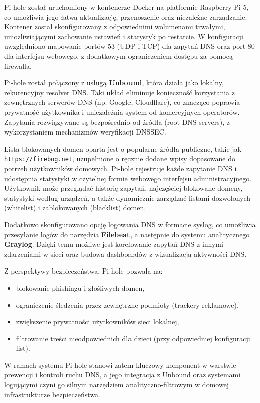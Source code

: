 \documentclass[
    left=2.5cm,         %
    right=2.5cm,        %
    top=2.5cm,          %
    bottom=3cm,         %
    bindingoffset=6mm,  %
    nohyphenation=true %
]{eiti/eiti-thesis} %
\begin{document}
Pi-hole został uruchomiony w kontenerze Docker na platformie Raspberry Pi 5, co umożliwia jego łatwą aktualizację, przenoszenie oraz niezależne zarządzanie. Kontener został skonfigurowany z odpowiednimi wolumenami trwałymi, umożliwiającymi zachowanie ustawień i statystyk po restarcie. W konfiguracji uwzględniono mapowanie portów 53 (UDP i TCP) dla zapytań DNS oraz port 80 dla interfejsu webowego, z dodatkowym ograniczeniem dostępu za pomocą firewalla.

Pi-hole został połączony z usługą \textbf{Unbound}, która działa jako lokalny, rekurencyjny resolver DNS. Taki układ eliminuje konieczność korzystania z zewnętrznych serwerów DNS (np. Google, Cloudflare), co znacząco poprawia prywatność użytkownika i uniezależnia system od komercyjnych operatorów. Zapytania rozwiązywane są bezpośrednio od źródła (root DNS servers), z wykorzystaniem mechanizmów weryfikacji DNSSEC.

Lista blokowanych domen oparta jest o popularne źródła publiczne, takie jak \texttt{https://firebog.net}, uzupełnione o ręcznie dodane wpisy dopasowane do potrzeb użytkowników domowych. Pi-hole rejestruje każde zapytanie DNS i udostępnia statystyki w czytelnej formie webowego interfejsu administracyjnego. Użytkownik może przeglądać historię zapytań, najczęściej blokowane domeny, statystyki według urządzeń, a także dynamicznie zarządzać listami dozwolonych (whitelist) i zablokowanych (blacklist) domen.

Dodatkowo skonfigurowano opcję logowania DNS w formacie syslog, co umożliwia przesyłanie logów do narzędzia \textbf{Filebeat}, a następnie do systemu analitycznego \textbf{Graylog}. Dzięki temu możliwe jest korelowanie zapytań DNS z innymi zdarzeniami w sieci oraz budowa dashboardów z wizualizacją aktywności DNS.

Z perspektywy bezpieczeństwa, Pi-hole pozwala na:
\begin{itemize}
    \item blokowanie phishingu i złośliwych domen,
    \item ograniczenie śledzenia przez zewnętrzne podmioty (trackery reklamowe),
    \item zwiększenie prywatności użytkowników sieci lokalnej,
    \item filtrowanie treści nieodpowiednich dla dzieci (przy odpowiedniej konfiguracji list).
\end{itemize}

W ramach systemu Pi-hole stanowi zatem kluczowy komponent w warstwie prewencji i kontroli ruchu DNS, a jego integracja z Unbound oraz systemami logującymi czyni go silnym narzędziem analityczno-filtrowym w domowej infrastrukturze bezpieczeństwa.
\end{document}
